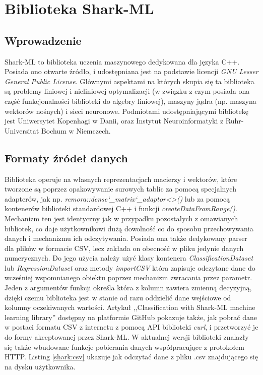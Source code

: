 \chapter{Biblioteka Shark-ML}

\section{Wprowadzenie}

Shark-ML to biblioteka uczenia maszynowego dedykowana dla języka C++. Posiada ono otwarte źródło, i udostępniana jest na podstawie licencji \textit{GNU Lesser General Public License}. Głównymi aspektami na których skupia się ta biblioteka są problemy liniowej i nieliniowej optymalizacji (w związku z czym posiada ona część funkcjonalności biblioteki do algebry liniowej), maszyny jądra (np. maszyna wektorów nośnych) i sieci neuronowe. \cite{shark} Podmiotami udostępniającymi bibliotekę jest Uniwersytet Kopenhagi w Danii, oraz Instytut Neuroinformatyki z Ruhr-Universitat Bochum w Niemczech.

\section{Formaty źródeł danych}

Biblioteka operuje na własnych reprezentacjach macierzy i wektorów, które tworzone są poprzez opakowywanie surowych tablic za pomocą specjalnych adapterów, jak np. \textit{remora::dense\char`_matrix\char`_adaptor<>()} lub za pomocą kontenerów biblioteki standardowej C++ i funkcji \textit{createDataFromRange()}. Mechanizm ten jest identyczny jak w przypadku pozostałych z omawianych bibliotek, co daje użytkownikowi dużą dowolność co do sposobu przechowywania danych i mechanizmu ich odczytywania. Posiada ona także dedykowany parser dla plików w formacie CSV, lecz zakłada on obecność w pliku jedynie danych numerycznych. Do jego użycia należy użyć klasy kontenera \textit{ClassificationDataset} lub \textit{RegressionDataset} oraz metody \textit{importCSV} która zapisuje odczytane dane do wcześniej wspomnianego obiektu poprzez mechanizm zwracania przez parametr. Jeden z argumentów funkcji określa która z kolumn zawiera zmienną decyzyjną, dzięki czemu biblioteka jest w stanie od razu oddzielić dane wejściowe od kolumny oczekiwanych wartości. Artykuł ,,Classification with Shark-ML machine learning library''\cite{shark:http} dostępny na platformie GitHub pokazuje także, jak pobrać dane w postaci formatu CSV z internetu z pomocą API biblioteki \textit{curl}, i przetworzyć je do formy akceptowanej przez Shark-ML. W aktualnej wersji biblioteki znalazły się także wbudowane funkcje pobierania danych współpracujące z protokołem HTTP. Listing \ref{shark:csv} ukazuje jak odczytać dane z pliku .csv znajdującego się na dysku użytkownika.

